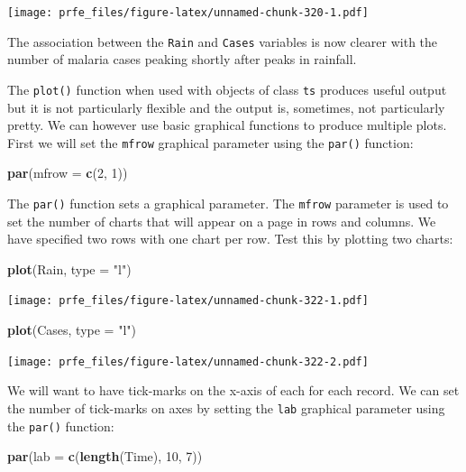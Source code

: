 \documentclass[12pt,]{book}
\newenvironment{Shaded}{\begin{snugshade}}{\end{snugshade}}
\newcommand{\KeywordTok}[1]{\textcolor[rgb]{0.13,0.29,0.53}{\textbf{#1}}}
\newcommand{\DataTypeTok}[1]{\textcolor[rgb]{0.13,0.29,0.53}{#1}}
\newcommand{\DecValTok}[1]{\textcolor[rgb]{0.00,0.00,0.81}{#1}}
\newcommand{\StringTok}[1]{\textcolor[rgb]{0.31,0.60,0.02}{#1}}
\newcommand{\NormalTok}[1]{#1}
\theoremstyle{definition}
\theoremstyle{definition}
\theoremstyle{definition}
\theoremstyle{remark}
\begin{document}
\texttt{[image: prfe\_files/figure-latex/unnamed-chunk-320-1.pdf]}

The association between the \texttt{Rain} and \texttt{Cases} variables
is now clearer with the number of malaria cases peaking shortly after
peaks in rainfall.

The \texttt{plot()} function when used with objects of class \texttt{ts}
produces useful output but it is not particularly flexible and the
output is, sometimes, not particularly pretty. We can however use basic
graphical functions to produce multiple plots. First we will set the
\texttt{mfrow} graphical parameter using the \texttt{par()} function:

\begin{Shaded}
\begin{Highlighting}[]
\KeywordTok{par}\NormalTok{(}\DataTypeTok{mfrow =} \KeywordTok{c}\NormalTok{(}\DecValTok{2}\NormalTok{, }\DecValTok{1}\NormalTok{))}
\end{Highlighting}
\end{Shaded}

The \texttt{par()} function sets a graphical parameter. The
\texttt{mfrow} parameter is used to set the number of charts that will
appear on a page in rows and columns. We have specified two rows with
one chart per row. Test this by plotting two charts:

\begin{Shaded}
\begin{Highlighting}[]
\KeywordTok{plot}\NormalTok{(Rain, }\DataTypeTok{type =} \StringTok{"l"}\NormalTok{)}
\end{Highlighting}
\end{Shaded}

\texttt{[image: prfe\_files/figure-latex/unnamed-chunk-322-1.pdf]}

\begin{Shaded}
\begin{Highlighting}[]
\KeywordTok{plot}\NormalTok{(Cases, }\DataTypeTok{type =} \StringTok{"l"}\NormalTok{)}
\end{Highlighting}
\end{Shaded}

\texttt{[image: prfe\_files/figure-latex/unnamed-chunk-322-2.pdf]}

We will want to have tick-marks on the x-axis of each for each record.
We can set the number of tick-marks on axes by setting the \texttt{lab}
graphical parameter using the \texttt{par()} function:

\begin{Shaded}
\begin{Highlighting}[]
\KeywordTok{par}\NormalTok{(}\DataTypeTok{lab =} \KeywordTok{c}\NormalTok{(}\KeywordTok{length}\NormalTok{(Time), }\DecValTok{10}\NormalTok{, }\DecValTok{7}\NormalTok{))}
\end{Highlighting}
\end{Shaded}
\end{document}
